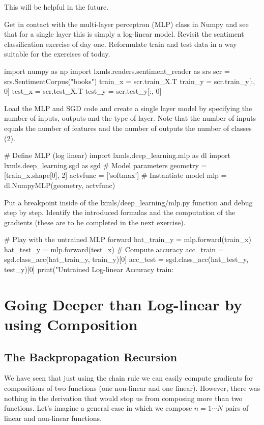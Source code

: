\noindent This will be helpful in the future.

\begin{exercise}\label{ex:dl1:mlp_numpy}
Get in contact with the multi-layer perceptron (MLP) class in Numpy and see
that for a single layer this is simply a log-linear model. Revisit the
sentiment classification exercise of day one. Reformulate train and test data
in a way suitable for the exercises of today.  
\begin{python}
import numpy as np
import lxmls.readers.sentiment_reader as srs  
scr     = srs.SentimentCorpus("books")
train_x = scr.train_X.T
train_y = scr.train_y[:, 0]
test_x  = scr.test_X.T
test_y  = scr.test_y[:, 0]
\end{python}
%
Load the MLP and SGD code and create a single layer model by specifying the
number of inputs, outputs and the type of layer. Note that the number of inputs
equals the number of features and the number of outputs the number of classes
(2).
%
\begin{python}
# Define MLP (log linear)
import lxmls.deep_learning.mlp as dl
import lxmls.deep_learning.sgd as sgd
# Model parameters
geometry = [train_x.shape[0], 2]
actvfunc = ['softmax']
# Instantiate model
mlp      = dl.NumpyMLP(geometry, actvfunc)
\end{python}
Put a breakpoint inside of the lxmls/deep\_learning/mlp.py function and debug
step by step. Identify the introduced formulas and the computation of the
gradients (these are to be completed in the next exercise). 
\begin{python}
# Play with the untrained MLP forward
hat_train_y = mlp.forward(train_x) 
hat_test_y  = mlp.forward(test_x) 
# Compute accuracy
acc_train = sgd.class_acc(hat_train_y, train_y)[0]
acc_test  = sgd.class_acc(hat_test_y, test_y)[0]
print("Untrained Log-linear Accuracy train: %
\end{python}
\end{exercise}

\section{Going Deeper than Log-linear by using Composition}

\subsection{The Backpropagation Recursion}

We have seen that just using the chain rule we can easily compute gradients for
compositions of two functions (one non-linear and one linear). However, there
was nothing in the derivation that would stop us from composing more than two
functions. Let's imagine a general case in which we compose $n=1 \cdots N$
pairs of linear and non-linear functions.

